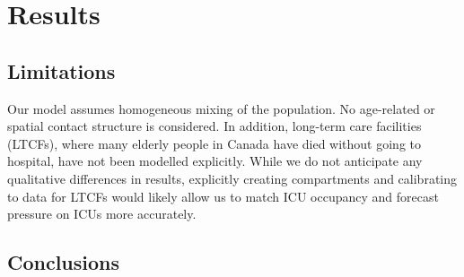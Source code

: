 \documentclass[12pt]{article}\usepackage[]{graphicx}\usepackage[]{color}
\begin{document}
\bigbreak \bigbreak \bigbreak


\FloatBarrier

\hypertarget{sec:Results}{}
\section{Results}


\subsection{Limitations}

Our model assumes homogeneous mixing of the population.  No
age-related or spatial contact structure is considered.  In addition,
long-term care facilities (LTCFs), where many elderly people in Canada
have died without going to hospital, have not been modelled
explicitly.  While we do not anticipate any qualitative differences in
results, explicitly creating compartments and calibrating to data for
LTCFs would likely allow us to match ICU occupancy and forecast
pressure on ICUs more accurately.

\subsection{Conclusions}

\end{document}
